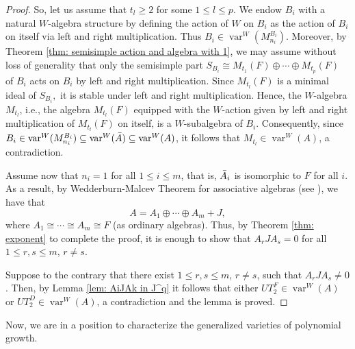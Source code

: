 \documentclass[reqno]{amsart}
\theoremstyle{definition}
\numberwithin{equation}{section}
\numberwithin{theorem}{section}
\DeclareMathOperator{\V}{var}
\begin{document}
\begin{proof}
So, let us assume that $t_l\geq 2$ for some $1\leq l \leq p.$  We endow $B_i$  with a natural $W$-algebra structure by defining the action of $W$ on $B_i$ as the action of $B_i$ on itself via left and right multiplication. Thus $B_i\in \V^W(M_{n_i}^{B_i})$. Moreover, by Theorem \ref{thm: semisimple action and algebra with 1}, we may assume without loss of generality that only the semisimple part $S_{B_i}\cong M_{t_1}(F)\oplus \cdots \oplus M_{t_p}(F)$ of $B_i$ acts on $B_i$ by left and right multiplication.
Since $M_{t_l}(F)$ is a minimal ideal of $S_{B_i},$ it is stable under left and right multiplication.  Hence, the $W$-algebra $M_{t_l}$, i.e., the algebra $M_{t_l}(F)$ equipped with the $W$-action given by left and right multiplication of $M_{t_l}(F)$ on itself, is a $W$-subalgebra of $B_i$.
 Consequently, since $B_i\in\V^W(M_{n_i}^{B_i}) \subseteq \V^W(\Bar{A})\subseteq \V^W(A)$,  it follows that $M_{t_l}\in \V^W(A)$, a contradiction.

    
    
    Assume now that $n_i=1$ for all $1\leq i \leq m$, that is, $\Bar{A}_i$ is isomorphic to $F$ for all $i$. As a result, by Wedderburn-Malcev Theorem for associative algebras (see \cite[Theorem 3.4.3]{GZbook}), we have that
    $$
    A=A_1\oplus \cdots \oplus A_m + J,
    $$
    where $A_1\cong \cdots \cong A_m \cong F$ (as ordinary algebras). Thus, by Theorem \ref{thm: exponent} to complete the proof, it is enough to show that $A_r JA_s=0$  for all $1 \leq r,s\leq m$, $r\neq s$.  
    
    Suppose to the contrary that there exist $1\leq r,s\leq  m$, $r \neq s$, such that $A_r JA_s\neq 0$. Then, by Lemma  \ref{lem: AiJAk in J^q}  it follows that either $UT_2^F\in \V^W(A)$ or $UT_2^D\in \V^W(A)$, a contradiction and the lemma is proved.	
\end{proof}



Now, we are in a position to characterize the generalized varieties of polynomial growth.
\end{document}
